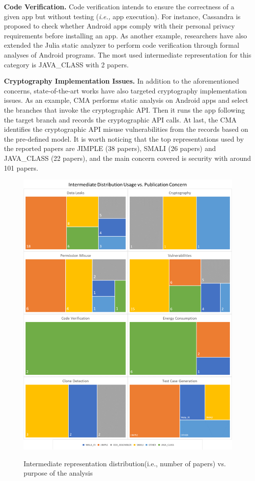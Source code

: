 \textbf{Code Verification.} 
Code verification intends to ensure the correctness of a given app but without testing (\textit{i.e.,} app execution). For instance, Cassandra \cite{lortz:SPSMD2014} is proposed to check whether Android apps comply with their personal privacy requirements before installing an app. As another example, researchers have also extended the Julia \cite{payet:IST2012} static analyzer to perform code verification through formal analyses of Android programs. The most used intermediate representation for this category is JAVA\_CLASS with 2 papers.

\textbf{Cryptography Implementation Issues.} In addition to the aforementioned concerns, state-of-the-art works have also targeted cryptography implementation issues. As an example, CMA \cite{shuai2014modelling} performs static analysis on Android apps and select the branches that invoke the cryptographic API. Then it runs the app following the target branch and records the cryptographic API calls. At last, the CMA identifies the cryptographic API misuse vulnerabilities from the records based on the pre-defined model.
It is worth noticing that the top representations used by the reported papers are JIMPLE (38 papers), SMALI (26 papers) and JAVA\_CLASS (22 papers), and the main concern covered is security with around 101 papers.

\begin{figure}[h!]
	\caption{Intermediate representation distribution(i.e., number of papers) vs. purpose of the analysis}
	\centering
	\includegraphics[width=\textwidth]{../Figures/IRvsPC}
	\label{fig:irvspc}
\end{figure}

